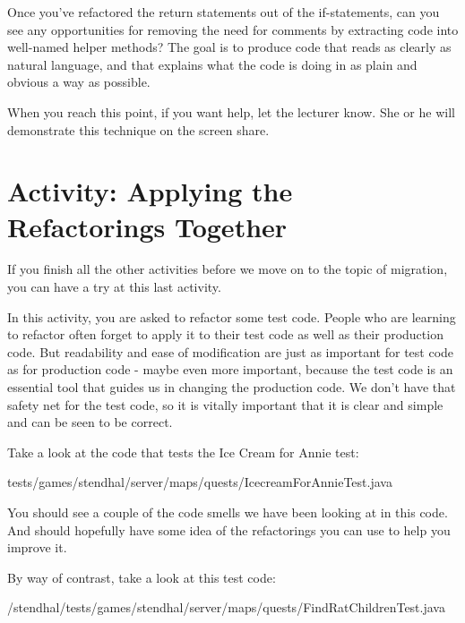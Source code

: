 \documentclass[
]{book}
\newenvironment{Shaded}{\begin{snugshade}}{\end{snugshade}}
\newcommand{\FunctionTok}[1]{\textcolor[rgb]{0.00,0.00,0.00}{#1}}
\newcommand{\NormalTok}[1]{#1}
\begin{document}
Once you've refactored the return statements out of the if-statements, can you see any opportunities for removing the need for comments by extracting code into well-named helper methods? The goal is to produce code that reads as clearly as natural language, and that explains what the code is doing in as plain and obvious a way as possible.

When you reach this point, if you want help, let the lecturer know. She or he will demonstrate this technique on the screen share.

\hypertarget{refactorings}{%
\section{Activity: Applying the Refactorings Together}\label{refactorings}}

If you finish all the other activities before we move on to the topic of migration, you can have a try at this last activity.

In this activity, you are asked to refactor some test code. People who are learning to refactor often forget to apply it to their test code as well as their production code. But readability and ease of modification are just as important for test code as for production code - maybe even more important, because the test code is an essential tool that guides us in changing the production code. We don't have that safety net for the test code, so it is vitally important that it is clear and simple and can be seen to be correct.

Take a look at the code that tests the Ice Cream for Annie test:

\begin{Shaded}
\begin{Highlighting}[]
\NormalTok{tests/games/stendhal/server/maps/quests/IcecreamForAnnieTest.}\FunctionTok{java}
\end{Highlighting}
\end{Shaded}

You should see a couple of the code smells we have been looking at in this code. And should hopefully have some idea of the refactorings you can use to help you improve it.

By way of contrast, take a look at this test code:

\begin{Shaded}
\begin{Highlighting}[]
\NormalTok{/stendhal/tests/games/stendhal/server/maps/quests/FindRatChildrenTest.}\FunctionTok{java}
\end{Highlighting}
\end{Shaded}
\end{document}

